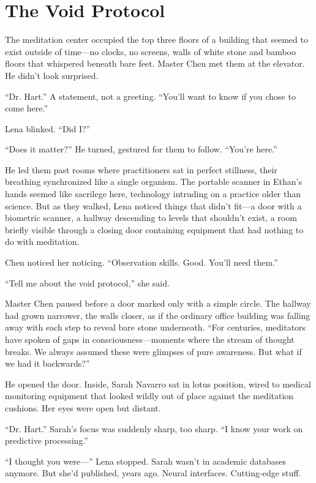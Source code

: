 \chapter{The Void Protocol}

The meditation center occupied the top three floors of a building that seemed to exist outside of time—no clocks, no screens, walls of white stone and bamboo floors that whispered beneath bare feet. Master Chen met them at the elevator. He didn't look surprised.

``Dr. Hart.'' A statement, not a greeting. ``You'll want to know if you chose to come here.''

Lena blinked. ``Did I?''

``Does it matter?'' He turned, gestured for them to follow. ``You're here.''

He led them past rooms where practitioners sat in perfect stillness, their breathing synchronized like a single organism. The portable scanner in Ethan's hands seemed like sacrilege here, technology intruding on a practice older than science. But as they walked, Lena noticed things that didn't fit—a door with a biometric scanner, a hallway descending to levels that shouldn't exist, a room briefly visible through a closing door containing equipment that had nothing to do with meditation.

Chen noticed her noticing. ``Observation skills. Good. You'll need them.''

``Tell me about the void protocol,'' she said.

Master Chen paused before a door marked only with a simple circle. The hallway had grown narrower, the walls closer, as if the ordinary office building was falling away with each step to reveal bare stone underneath. ``For centuries, meditators have spoken of gaps in consciousness—moments where the stream of thought breaks. We always assumed these were glimpses of pure awareness. But what if we had it backwards?''

He opened the door. Inside, Sarah Navarro sat in lotus position, wired to medical monitoring equipment that looked wildly out of place against the meditation cushions. Her eyes were open but distant.

``Dr. Hart.'' Sarah's focus was suddenly sharp, too sharp. ``I know your work on predictive processing.''

``I thought you were—'' Lena stopped. Sarah wasn't in academic databases anymore. But she'd published, years ago. Neural interfaces. Cutting-edge stuff.

